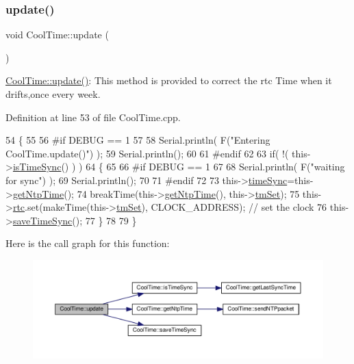 \subsubsection{\texorpdfstring{update()}{update()}}
{\footnotesize\ttfamily void Cool\+Time\+::update (\begin{DoxyParamCaption}{ }\end{DoxyParamCaption})}

\hyperlink{class_cool_time_aae601f795452cfa48d9fb337aed483a8}{Cool\+Time\+::update()}\+: This method is provided to correct the rtc Time when it drifts,once every week. 

Definition at line 53 of file Cool\+Time.\+cpp.


\begin{DoxyCode}
54 \{
55 
56 \textcolor{preprocessor}{#if DEBUG == 1}
57 
58     Serial.println( F(\textcolor{stringliteral}{"Entering CoolTime.update()"}) );
59     Serial.println();
60 
61 \textcolor{preprocessor}{#endif }
62 
63     \textcolor{keywordflow}{if}( !( this->\hyperlink{class_cool_time_a5ae038a4498602b189f76a10bf02adf8}{isTimeSync}() ) )
64     \{
65     
66 \textcolor{preprocessor}{    #if DEBUG == 1}
67 
68         Serial.println( F(\textcolor{stringliteral}{"waiting for sync"}) );
69         Serial.println();
70 
71 \textcolor{preprocessor}{    #endif }
72 
73         this->\hyperlink{class_cool_time_a9d032e76c3470a15b3bbbc52af6463f7}{timeSync}=this->\hyperlink{class_cool_time_a41fbbbfd651c2079f54d4b2911e4c705}{getNtpTime}();
74         breakTime(this->\hyperlink{class_cool_time_a41fbbbfd651c2079f54d4b2911e4c705}{getNtpTime}(), this->\hyperlink{class_cool_time_ad33c2713c903ff064ad09c46406ae088}{tmSet});
75         this->\hyperlink{class_cool_time_abd38f2384ff90692b1568d9db869412e}{rtc}.set(makeTime(this->\hyperlink{class_cool_time_ad33c2713c903ff064ad09c46406ae088}{tmSet}), CLOCK\_ADDRESS); \textcolor{comment}{// set the clock}
76         this->\hyperlink{class_cool_time_ae9658c9b377510d469e3b88edf33ee85}{saveTimeSync}();
77     \}
78     
79 \}
\end{DoxyCode}
Here is the call graph for this function\+:\nopagebreak
\begin{figure}[H]
\begin{center}
\leavevmode
\includegraphics[width=350pt]{d6/d49/class_cool_time_aae601f795452cfa48d9fb337aed483a8_cgraph}
\end{center}
\end{figure}
